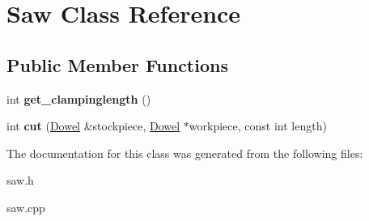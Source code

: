 \hypertarget{classSaw}{\section{Saw Class Reference}
\label{classSaw}
}
\subsection*{Public Member Functions}
\begin{DoxyCompactItemize}
\item 
\hypertarget{classSaw_afb846623b87e8fc10161d2aa6010d6d1}{int {\bfseries get\-\_\-clampinglength} ()}\label{classSaw_afb846623b87e8fc10161d2aa6010d6d1}

\item 
\hypertarget{classSaw_a94322c593036ac438cd19adc52df1091}{int {\bfseries cut} (\hyperlink{classDowel}{Dowel} \&stockpiece, \hyperlink{classDowel}{Dowel} $\ast$workpiece, const int length)}\label{classSaw_a94322c593036ac438cd19adc52df1091}

\end{DoxyCompactItemize}


The documentation for this class was generated from the following files\-:\begin{DoxyCompactItemize}
\item 
saw.\-h\item 
saw.\-cpp\end{DoxyCompactItemize}
